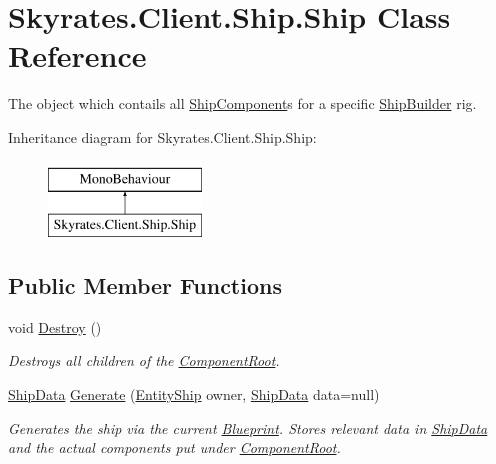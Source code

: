 \hypertarget{class_skyrates_1_1_client_1_1_ship_1_1_ship}{\section{Skyrates.\-Client.\-Ship.\-Ship Class Reference}
\label{class_skyrates_1_1_client_1_1_ship_1_1_ship}
}


The object which contails all \hyperlink{class_skyrates_1_1_client_1_1_ship_1_1_ship_component}{Ship\-Component}s for a specific \hyperlink{class_skyrates_1_1_client_1_1_ship_1_1_ship_builder}{Ship\-Builder} rig.  


Inheritance diagram for Skyrates.\-Client.\-Ship.\-Ship\-:\begin{figure}[H]
\begin{center}
\leavevmode
\includegraphics[height=2.000000cm]{class_skyrates_1_1_client_1_1_ship_1_1_ship}
\end{center}
\end{figure}
\subsection*{Public Member Functions}
\begin{DoxyCompactItemize}
\item 
void \hyperlink{class_skyrates_1_1_client_1_1_ship_1_1_ship_a0e10ad8211decc8c7bbb4c9ff49c3e17}{Destroy} ()
\begin{DoxyCompactList}\small\item\em Destroys all children of the \hyperlink{class_skyrates_1_1_client_1_1_ship_1_1_ship_a2c9f15ba4d40bfae0e0dd3c7958d4f22}{Component\-Root}. \end{DoxyCompactList}\item 
\hyperlink{class_ship_data}{Ship\-Data} \hyperlink{class_skyrates_1_1_client_1_1_ship_1_1_ship_a3a126b748f8c3265ab2d054c8c11ded7}{Generate} (\hyperlink{class_skyrates_1_1_client_1_1_entity_1_1_entity_ship}{Entity\-Ship} owner, \hyperlink{class_ship_data}{Ship\-Data} data=null)
\begin{DoxyCompactList}\small\item\em Generates the ship via the current \hyperlink{class_skyrates_1_1_client_1_1_ship_1_1_ship_a698461079579d1847c9d8a4fb4688da0}{Blueprint}. Stores relevant data in \hyperlink{class_ship_data}{Ship\-Data} and the actual components put under \hyperlink{class_skyrates_1_1_client_1_1_ship_1_1_ship_a2c9f15ba4d40bfae0e0dd3c7958d4f22}{Component\-Root}. \end{DoxyCompactList}\end{DoxyCompactItemize}
